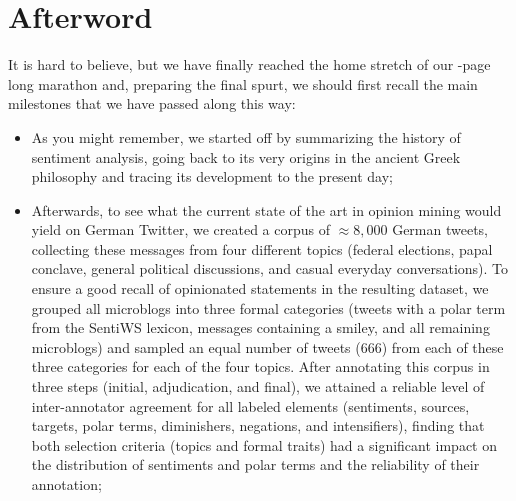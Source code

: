 \chapter*{Afterword}

It is hard to believe, but we have finally reached the home stretch of
our \thepage-page long marathon and, preparing the final spurt, we
should first recall the main milestones that we have passed along this
way:
\begin{itemize}
\item As you might remember, we started off by summarizing the history
  of sentiment analysis, going back to its very origins in the ancient
  Greek philosophy and tracing its development to the present day;

\item Afterwards, to see what the current state of the art in opinion
  mining would yield on German Twitter, we created a corpus of
  $\approx8,000$ German tweets, collecting these messages from four
  different topics (federal elections, papal conclave, general
  political discussions, and casual everyday conversations).  To
  ensure a good recall of opinionated statements in the resulting
  dataset, we grouped all microblogs into three formal categories
  (tweets with a polar term from the SentiWS lexicon, messages
  containing a smiley, and all remaining microblogs) and sampled an
  equal number of tweets (666) from each of these three categories for
  each of the four topics.  After annotating this corpus in three
  steps (initial, adjudication, and final), we attained a reliable
  level of inter-annotator agreement for all labeled elements
  (sentiments, sources, targets, polar terms, diminishers, negations,
  and intensifiers), finding that both selection criteria (topics and
  formal traits) had a significant impact on the distribution of
  sentiments and polar terms and the reliability of their annotation;


\end{itemize}
